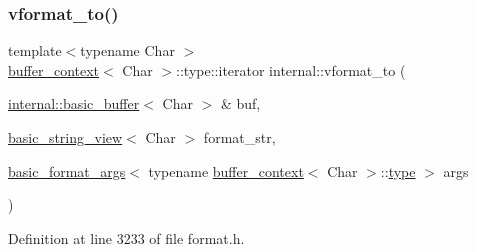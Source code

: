 \subsubsection{\texorpdfstring{vformat\+\_\+to()}{vformat\_to()}\hspace{0.1cm}{\footnotesize\ttfamily [2/2]}}
{\footnotesize\ttfamily template$<$typename Char $>$ \\
\hyperlink{structbuffer__context}{buffer\+\_\+context}$<$ Char $>$\+::type\+::iterator internal\+::vformat\+\_\+to (\begin{DoxyParamCaption}\item[{\hyperlink{classinternal_1_1basic__buffer}{internal\+::basic\+\_\+buffer}$<$ Char $>$ \&}]{buf,  }\item[{\hyperlink{classbasic__string__view}{basic\+\_\+string\+\_\+view}$<$ Char $>$}]{format\+\_\+str,  }\item[{\hyperlink{classbasic__format__args}{basic\+\_\+format\+\_\+args}$<$ typename \hyperlink{structbuffer__context}{buffer\+\_\+context}$<$ Char $>$\+::\hyperlink{namespaceinternal_a8661864098ac0acff9a6dd7e66f59038}{type} $>$}]{args }\end{DoxyParamCaption})}



Definition at line 3233 of file format.\+h.

